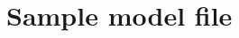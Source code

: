 \chapter{Sample \crava model file}
\label{sec:crava-model-file}

\vspace{-2em}

\begin{small}

\end{small}
